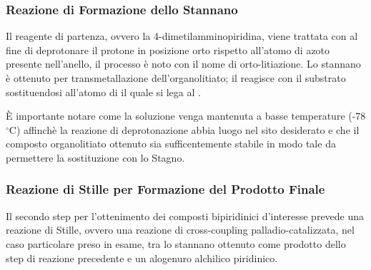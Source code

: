 \documentclass[a4paper, 12pt]{article}
\begin{document}
\subsubsection{Reazione di Formazione dello Stannano }
Il reagente di partenza, ovvero la 4-dimetilamminopiridina, viene trattata con  al fine di deprotonare il protone in posizione orto rispetto all'atomo di azoto presente nell'anello, il processo è noto con il nome di orto-litiazione. Lo stannano è ottenuto per transmetallazione dell'organolitiato; il  reagisce con il substrato sostituendosi all'atomo di  il quale si lega al .

È importante notare come la soluzione venga mantenuta a basse temperature (-78 $^\circ$C) affinchè la reazione di deprotonazione abbia luogo nel sito desiderato e che il composto organolitiato ottenuto sia sufficentemente stabile in modo tale da permettere la sostituzione con lo Stagno.

\subsubsection{Reazione di Stille per Formazione del Prodotto Finale}
Il secondo step per l'ottenimento dei composti bipiridinici d'interesse prevede una reazione di Stille, ovvero una reazione di cross-coupling palladio-catalizzata, nel caso particolare preso in esame, tra lo stannano ottenuto come prodotto dello step di reazione precedente e un alogenuro alchilico piridinico.\cite{clayden_organic_2012}
\end{document}
